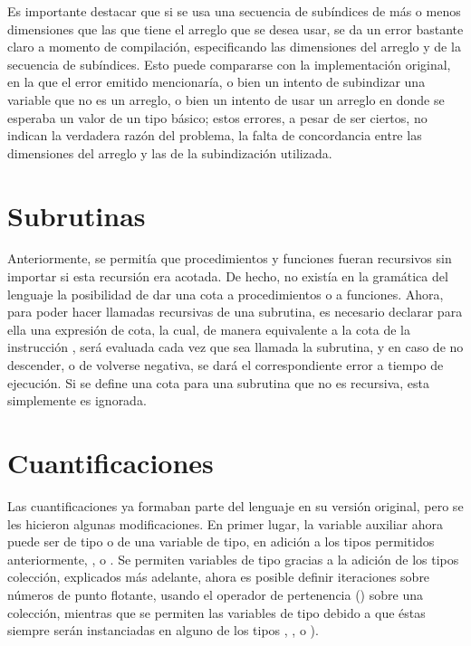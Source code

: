 Es importante destacar que si se usa una secuencia de subíndices de más o menos
dimensiones que las que tiene el arreglo que se desea usar, se da un error
bastante claro a momento de compilación, especificando las dimensiones del
arreglo y de la secuencia de subíndices. Esto puede compararse con la
implementación original, en la que el error emitido mencionaría, o bien un
intento de subindizar una variable que no es un arreglo, o bien un intento de
usar un arreglo en donde se esperaba un valor de un tipo básico; estos errores,
a pesar de ser ciertos, no indican la verdadera razón del problema, la falta de
concordancia entre las dimensiones del arreglo y las de la subindización
utilizada.

\section{Subrutinas}

Anteriormente, se permitía que procedimientos y funciones fueran recursivos sin
importar si esta recursión era acotada. De hecho, no existía en la gramática del
lenguaje la posibilidad de dar una cota a procedimientos o a funciones. Ahora,
para poder hacer llamadas recursivas de una subrutina, es necesario declarar
para ella una expresión de cota, la cual, de manera equivalente a la cota de la
instrucción , será evaluada cada vez que sea llamada la subrutina, y
en caso de no descender, o de volverse negativa, se dará el correspondiente
error a tiempo de ejecución. Si se define una cota para una subrutina que no es
recursiva, esta simplemente es ignorada.

\section{Cuantificaciones}

Las cuantificaciones ya formaban parte del lenguaje en su versión original, pero
se les hicieron algunas modificaciones. En primer lugar, la variable auxiliar
ahora puede ser de tipo  o de una variable de tipo, en adición a
los tipos permitidos anteriormente,  ,  o
. Se permiten variables de tipo  gracias a la
adición de los tipos colección, explicados más adelante, ahora es posible
definir iteraciones sobre números de punto flotante, usando el operador de
pertenencia (\Elem) sobre una colección, mientras que se permiten las variables
de tipo debido a que éstas siempre serán instanciadas en alguno de los
tipos , ,  o ).

